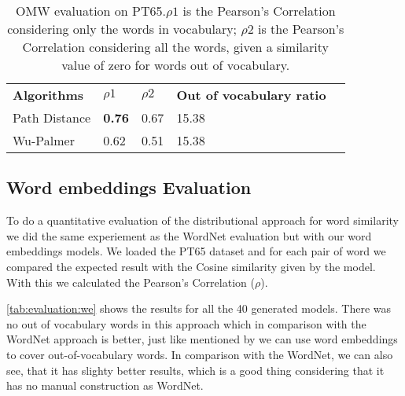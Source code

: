 \begin{table}[h]
    \caption{OMW evaluation on PT65.\textbf{$\rho1$} is the Pearson’s Correlation considering only the words in vocabulary; \textbf{$\rho2$} is the Pearson’s Correlation considering all the words, given a similarity value of zero for words out of vocabulary. }
    \label{tab:worneteval}
    \centering%
    \begin{minipage}{.8\textwidth}
    \begin{tabular}{@{}lllll@{}}
    \cmidrule(r){1-5}
    \textbf{Algorithms} & \textbf{$\rho1$} & \textbf{$\rho2$}         & \textbf{Out of vocabulary ratio} \\ 
    \cmidrule(r){1-4}
    Path Distance & \textbf{0.76} & 0.67   & 15.38                   \\
    Wu-Palmer     & 0.62    & 0.51         & 15.38                   \\ \cmidrule(r){1-4}
    \end{tabular}
    \end{minipage}
\end{table}









\subsection{Word embeddings Evaluation}\label{chap:results:we}

To do a quantitative evaluation of the distributional approach for word similarity we did the same experiement as the WordNet evaluation but with our word embeddings models.
We loaded the PT65 dataset and for each pair of word we compared the expected result with the Cosine similarity given by the model. With this we calculated the Pearson’s Correlation ($\rho$).

\autoref{tab:evaluation:we} shows the results for all the 40 generated models. There was no out of vocabulary words in this approach which in comparison with the WordNet approach is better, just like mentioned by  we can use word embeddings to cover out-of-vocabulary words. In comparison with the WordNet, we can also see, that it has slighty better results, which is a good thing considering that it has no manual construction as WordNet.

